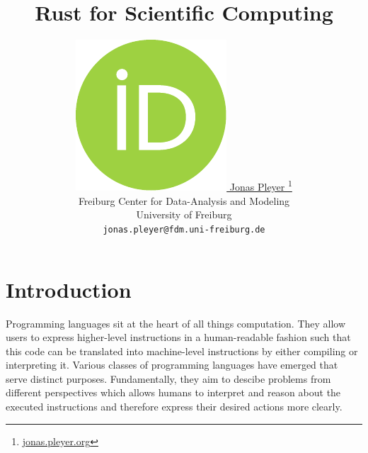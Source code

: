 \documentclass{article}
\title{Rust for Scientific Computing}
\author{
    \href{https://orcid.org/0009-0001-0613-7978}{
        \includegraphics[scale=0.06]{orcid.pdf}
        \hspace{1mm}Jonas Pleyer
    }
    \thanks{
        \href{https://jonas.pleyer.org}{jonas.pleyer.org}
    }\\
    Freiburg Center for Data-Analysis and Modeling\\
    University of Freiburg\\
    \texttt{jonas.pleyer@fdm.uni-freiburg.de}
}
\begin{document}
\maketitle

\begin{abstract}
\end{abstract}

\pagebreak
\tableofcontents

\pagebreak


\section{Introduction}


Programming languages sit at the heart of all things computation.
They allow users to express higher-level instructions in a human-readable fashion such that this
code can be translated into machine-level instructions by either compiling or interpreting it.
Various classes of programming languages have emerged that serve distinct purposes.
Fundamentally, they aim to descibe problems from different perspectives which allows humans to
interpret and reason about the executed instructions and therefore express their desired actions
more clearly.
\end{document}
